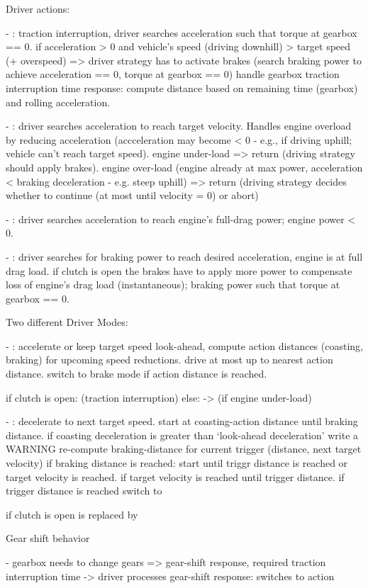

Driver actions:

- : traction interruption, driver searches acceleration such that torque at gearbox == 0.
   if acceleration > 0 and vehicle's speed (driving downhill) > target speed (+ overspeed) => driver strategy has to activate brakes (search braking power to achieve acceleration == 0, torque at gearbox == 0)
   handle gearbox traction interruption time response: compute distance based on remaining time (gearbox) and rolling acceleration.

- : driver searches acceleration to reach target velocity. Handles engine overload by reducing acceleration (accceleration may become < 0 - e.g., if driving uphill; vehicle can't reach target speed).
  engine under-load => return  (driving strategy should apply brakes).
  engine over-load (engine already at max power, acceleration < braking deceleration - e.g. steep uphill) => return  (driving strategy decides whether to continue (at most until velocity = 0) or abort)

- : driver searches acceleration to reach engine's full-drag power; engine power < 0.

- : driver searches for braking power to reach desired acceleration, engine is at full drag load.
    if clutch is open the brakes have to apply more power to compensate loss of engine's drag load (instantaneous); braking power such that torque at gearbox == 0.

Two different Driver Modes:

- : accelerate or keep target speed
	look-ahead, compute action distances (coasting, braking) for upcoming speed reductions. drive at most up to nearest action distance. switch to brake mode if action distance is reached.

	if clutch is open:  (traction interruption)
	else:  ->  (if engine under-load)

- : decelerate to next target speed.
    start  at coasting-action distance until braking distance. 
    if coasting deceleration is greater than `look-ahead deceleration' write a WARNING
    re-compute braking-distance for current trigger (distance, next target velocity)
    if braking distance is reached: start  until triggr distance is reached or target velocity is reached.
    if target velocity is reached  until trigger distance.
    if trigger distance is reached switch to 

    if clutch is open  is replaced by 


Gear shift behavior

- gearbox needs to change gears => gear-shift response, required traction interruption time
-> driver processes gear-shift response: switches to  action


